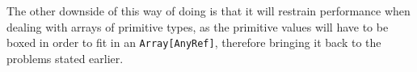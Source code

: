 The other downside of this way of doing is that it will restrain performance when dealing with arrays of primitive types, as the primitive values will have to be boxed in order to fit in an \lstinline|Array[AnyRef]|, therefore bringing it back to the problems stated earlier. 

